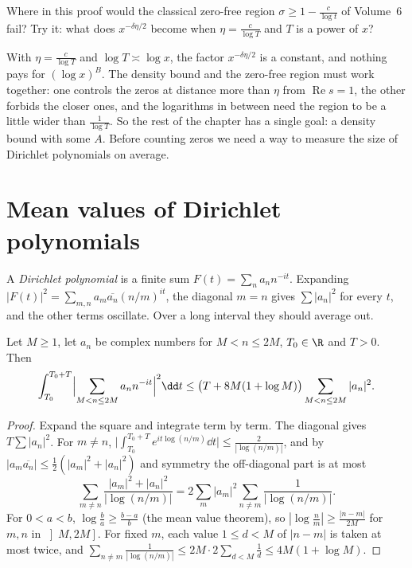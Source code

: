 \begin{think}
Where in this proof would the classical zero-free region $\sigma\ge1-\frac c{\log t}$ of Volume~6 fail? Try it: what does $x^{-\delta\eta/2}$ become when $\eta=\frac c{\log T}$ and $T$ is a power of $x$?
\end{think}

With $\eta=\frac c{\log T}$ and $\log T\asymp\log x$, the factor $x^{-\delta\eta/2}$ is a constant, and nothing pays for $(\log x)^B$. The density bound and the zero-free region must work together: one controls the zeros at distance more than $\eta$ from $\operatorname{Re}s=1$, the other forbids the closer ones, and the logarithms in between need the
region to be a little wider than $\frac1{\log T}$. So the rest of the chapter has a single goal: a density bound with some $A$. Before counting zeros we need a way to measure the size of Dirichlet polynomials on average.

\section{Mean values of Dirichlet polynomials}

A \emph{Dirichlet polynomial} is a finite sum $F(t)=\sum_na_nn^{-it}$. Expanding $|F(t)|^2=\sum_{m,n}a_m\overline{a_n}(n/m)^{it}$, the diagonal $m=n$ gives $\sum|a_n|^2$ for every $t$, and the other terms oscillate. Over a long interval they should average out.

\begin{lemma}\label{lem:mvt}
Let $M\ge1$, let $a_n$ be complex numbers for $M<n\le2M$, $T_0\in\R$ and $T>0$. Then
\[
\int_{T_0}^{T_0+T}\Bigl|\sum_{M<n\le2M}a_nn^{-it}\Bigr|^2\dd t\le\bigl(T+8M(1+\log M)\bigr)\sum_{M<n\le2M}|a_n|^2.
\]
\end{lemma}
\begin{proof}
Expand the square and integrate term by term. The diagonal gives $T\sum|a_n|^2$. For $m\ne n$, $\bigl|\int_{T_0}^{T_0+T}e^{it\log(n/m)}\dd t\bigr|\le\frac2{|\log(n/m)|}$, and by $|a_m\overline{a_n}|\le\frac12(|a_m|^2+|a_n|^2)$ and symmetry the off-diagonal part is at most
\[
\sum_{m\ne n}\frac{|a_m|^2+|a_n|^2}{|\log(n/m)|}=2\sum_m|a_m|^2\sum_{n\ne m}\frac1{|\log(n/m)|}.
\]
For $0<a<b$, $\log\frac ba\ge\frac{b-a}b$ (the mean value theorem), so $|\log\frac nm|\ge\frac{|n-m|}{2M}$ for $m,n$ in $\left]M,2M\right]$. For fixed $m$, each value $1\le d<M$ of $|n-m|$ is taken at most twice, and $\sum_{n\ne m}\frac1{|\log(n/m)|}\le2M\cdot2\sum_{d<M}\frac1d\le4M(1+\log M)$.
\end{proof}


